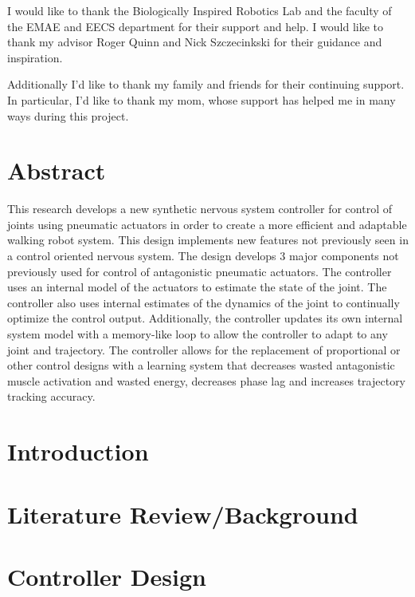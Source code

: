 \documentclass[12pt, letterpaper, oneside, onecolumn]{report} %
\begin{document}
I would like to thank the Biologically Inspired Robotics Lab and the faculty of
the EMAE and EECS department for their support and help. I would like to thank my advisor Roger Quinn and Nick Szczecinkski for their guidance and inspiration.

Additionally I'd like to thank my family and friends for their continuing support. In particular, I'd like to thank my mom, whose support has helped me in many ways during this project.

\chapter*{Abstract}
\label{chap:abstract}

This research develops a new synthetic nervous system controller for control of joints using pneumatic actuators in order to create a more efficient and adaptable walking robot system. This design implements new features not previously seen in a control oriented nervous system. The design develops 3 major components not previously used for control of antagonistic pneumatic actuators. The controller uses an internal model of the actuators to estimate the state of the joint. The controller also uses internal estimates of the dynamics of the joint to continually optimize the control output. Additionally, the controller updates its own internal system model with a memory-like loop to allow the controller to adapt to any joint and trajectory. The controller allows for the replacement of proportional or other control designs with a learning system that decreases wasted antagonistic muscle activation and wasted energy, decreases phase lag and increases trajectory tracking accuracy.

\chapter{Introduction}
\label{chap:introduction}



\chapter{Literature Review/Background}
\label{chap:lit_review}


\chapter{Controller Design}
\label{chap:controller_design}

\end{document}
